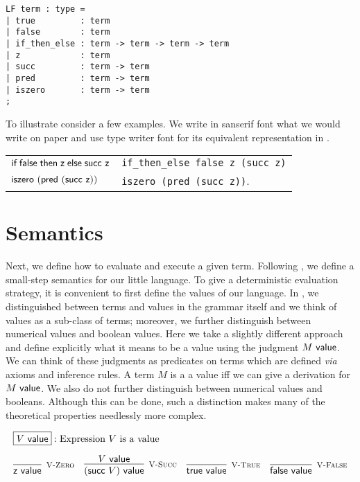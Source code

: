 \begin{lstlisting}
LF term : type =
| true         : term
| false        : term
| if_then_else : term -> term -> term -> term
| z            : term
| succ         : term -> term
| pred         : term -> term
| iszero       : term -> term
;
\end{lstlisting}

To illustrate consider a few examples. We write in sanserif font what
we would write on paper and use type writer font for its equivalent
representation in \beluga.

\begin{center}
\begin{tabular}{l@{\quad is represented as \quad}l}
$\textsf{if\;} \textsf{false} \textsf{\;then\;} \textsf{z} \textsf{\;else\;} \textsf{succ}~\textsf{z}$ &
\lstinline!if_then_else false z (succ z)!\\
$\textsf{iszero}~(\textsf{pred}~(\textsf{succ}~\textsf{z}))$ & \lstinline!iszero (pred (succ z))!.
\end{tabular}
\end{center}


\section{Semantics}
Next, we define how to evaluate and execute a given term. Following
\cite{TAPL}, we define  a small-step semantics  for our  little language. To give  a  deterministic evaluation
strategy,  it is convenient to first define the values of our language.  In
\cite{TAPL}, we distinguished between terms and values in the grammar itself and
we think of values  as a sub-class of terms; moreover, we further
distinguish between numerical values and boolean values. Here we take  a slightly different
approach and define explicitly  what it means  to be a value using the judgment
$M ~\mathsf{value}$.  We can think of these judgments  as predicates on
terms which are defined  {\em via}  axioms and inference rules.  A term $M$ is a
a value iff we can give a derivation for $M ~\mathsf{value}$. We also do not further
distinguish between numerical values and  booleans. Although this can
be done, such a distinction makes many of the theoretical properties
needlessly more complex.

\[
\begin{array}{c}
\multicolumn{1}{l}{\fbox{$V \Value$}: \mbox{Expression $V$ is a value}}\\[1em]
\infer[\VZero]{\tmzero \Value}{} \quad
\infer[\VSucc]{(\tmsucc V) \Value}{V \Value} \quad
\infer[\VTrue]{\tmtrue \Value}{} \quad
\infer[\VFalse]{\tmfalse \Value}{}
\end{array}
\]

